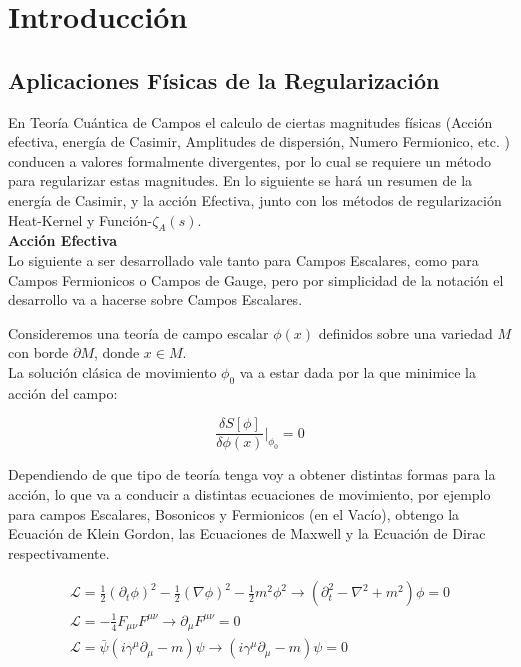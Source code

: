 \chapter{Introducción}


\section{ Aplicaciones Físicas de la Regularización }

En Teoría Cuántica de Campos el calculo de ciertas magnitudes físicas (Acción efectiva, energía de Casimir, Amplitudes de dispersión, Numero Fermionico, etc. ) conducen a valores formalmente divergentes, por lo cual se requiere un método para regularizar estas magnitudes. En lo siguiente se hará un resumen de la energía de Casimir, y la acción Efectiva, junto con los métodos de regularización Heat-Kernel y Función-$ \zeta _A (s) $.\\





\textbf{Acción Efectiva}\\

Lo siguiente a ser desarrollado vale tanto para Campos Escalares, como para Campos Fermionicos o Campos de Gauge, pero por simplicidad de la notación el desarrollo va a hacerse sobre Campos Escalares.

Consideremos una teoría de campo escalar $\phi(x)$ definidos sobre una variedad $M$ con borde $\partial M$, donde $x \in  M$. \\

La solución clásica de movimiento $ \phi _0 $ va a estar dada por la que minimice la acción del campo:

\begin{equation}
\frac{\delta S [ \phi ] }{\delta \phi (x)} | _{\phi _0} = 0
\end{equation}


Dependiendo de que tipo de teoría tenga voy a obtener distintas formas para la acción, lo que va a conducir a distintas ecuaciones de movimiento, por ejemplo para campos Escalares, Bosonicos y Fermionicos (en el Vacío), obtengo  la Ecuación de Klein Gordon, las Ecuaciones de Maxwell y la Ecuación de Dirac respectivamente.

\begin{equation}
\begin{array}{c}
\mathscr{L} = \frac{1}{2} (\partial _t \phi ) ^2 - \frac{1}{2} ( \nabla \phi ) ^2 - \frac{1}{2} m ^2 \phi ^2 
\rightarrow 
\left(
	\partial _t ^2 - \nabla ^2 + m^2 
		\right) \phi = 0 \\
\mathscr{L} = - \frac{1}{4} F _{\mu \nu} F ^{\mu \nu}
\rightarrow \partial _{\mu} F ^{\mu \nu} = 0
 \\
\mathscr{L} = { \bar{\psi} } \left(
			i \gamma ^{\mu} \partial _{\mu} - m 
			\right) \psi 
\rightarrow
			\left( i \gamma ^{\mu} \partial _{\mu}  - m   \right)\psi = 0
\end{array}
\end{equation}




